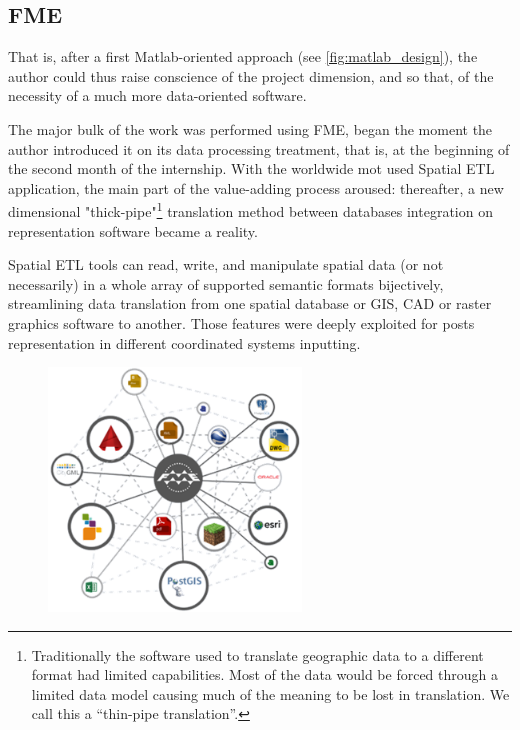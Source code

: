 \subsection{FME}
\label{sec:approach:software:FME}
That is, after a first Matlab-oriented approach (see \autoref{fig:matlab_design}), the author could thus raise conscience of the project dimension, and so that, of the necessity of a much more data-oriented software.

The major bulk of the work was performed using FME, began the moment the author introduced it on its data processing treatment, that is, at the beginning of the second month of the internship. With the worldwide mot used Spatial ETL application, the main part of the value-adding process aroused: thereafter, a new dimensional "thick-pipe"\footnote{Traditionally the software used to translate geographic data to a different format had limited capabilities. Most of the data would be forced through a limited data model causing much of the meaning to be lost in translation. We call this a “thin-pipe translation”.} translation method between databases integration on representation software became a reality.  

Spatial ETL tools can read, write, and manipulate spatial data (or not necessarily) in a whole array of supported semantic formats bijectively, streamlining data translation from one spatial database or GIS, CAD or raster graphics software to another. Those features were deeply exploited for posts representation in different coordinated systems inputting.

\begin{figure}[h!]
    \centering
    \parbox[t]{0.6\textwidth}{
    \href{https://www.safe.com/how-it-works/}{\includegraphics[width=0.6\textwidth]{0.figuras/FME_versatility.png}}
    \label{fig:FMEversatility}}
\end{figure}

